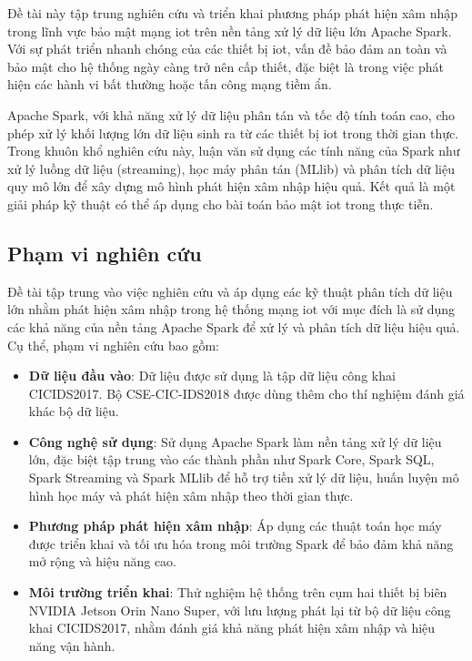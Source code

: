 Đề tài này tập trung nghiên cứu và triển khai phương pháp phát hiện xâm nhập trong lĩnh vực bảo mật mạng \ac{iot} trên nền tảng xử lý dữ liệu lớn Apache Spark. Với sự phát triển nhanh chóng của các thiết bị \ac{iot}, vấn đề bảo đảm an toàn và bảo mật cho hệ thống ngày càng trở nên cấp thiết, đặc biệt là trong việc phát hiện các hành vi bất thường hoặc tấn công mạng tiềm ẩn.

Apache Spark, với khả năng xử lý dữ liệu phân tán và tốc độ tính toán cao, cho phép xử lý khối lượng lớn dữ liệu sinh ra từ các thiết bị \ac{iot} trong thời gian thực. Trong khuôn khổ nghiên cứu này, luận văn sử dụng các tính năng của Spark như xử lý luồng dữ liệu (streaming), học máy phân tán (MLlib) và phân tích dữ liệu quy mô lớn để xây dựng mô hình phát hiện xâm nhập hiệu quả. Kết quả là một giải pháp kỹ thuật có thể áp dụng cho bài toán bảo mật \ac{iot} trong thực tiễn.

\subsection{Phạm vi nghiên cứu}
\label{sec:PhamVi}
Đề tài tập trung vào việc nghiên cứu và áp dụng các kỹ thuật phân tích dữ liệu lớn nhằm phát hiện xâm nhập trong hệ thống mạng \ac{iot} với mục đích là sử dụng các khả năng của nền tảng Apache Spark để xử lý và phân tích dữ liệu hiệu quả. Cụ thể, phạm vi nghiên cứu bao gồm:
\begin{itemize}
  \item \textbf{Dữ liệu đầu vào}: Dữ liệu được sử dụng là tập dữ liệu công khai CICIDS2017. Bộ CSE-CIC-IDS2018 được dùng thêm cho thí nghiệm đánh giá khác bộ dữ liệu.
  \item \textbf{Công nghệ sử dụng}: Sử dụng Apache Spark làm nền tảng xử lý dữ liệu lớn, đặc biệt tập trung vào các thành phần như Spark Core, Spark SQL, Spark Streaming và Spark MLlib để hỗ trợ tiền xử lý dữ liệu, huấn luyện mô hình học máy và phát hiện xâm nhập theo thời gian thực.
  \item \textbf{Phương pháp phát hiện xâm nhập}: Áp dụng các thuật toán học máy được triển khai và tối ưu hóa trong môi trường Spark để bảo đảm khả năng mở rộng và hiệu năng cao.
  \item \textbf{Môi trường triển khai}: Thử nghiệm hệ thống trên cụm hai thiết bị biên NVIDIA Jetson Orin Nano Super, với lưu lượng phát lại từ bộ dữ liệu công khai CICIDS2017, nhằm đánh giá khả năng phát hiện xâm nhập và hiệu năng vận hành.
\end{itemize}

